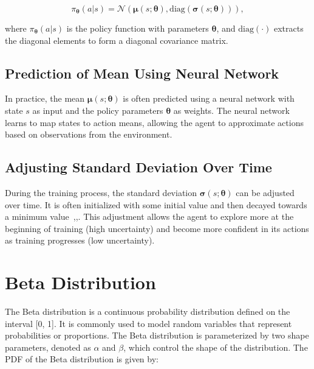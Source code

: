 \begin{equation}
    \pi_{\boldsymbol{\theta}}(a | s) = \mathcal{N}(\boldsymbol{\mu}(s; \boldsymbol{\theta}), \text{diag}(\boldsymbol{\sigma}(s; \boldsymbol{\theta}))),\label{eq:equation2}
\end{equation}

where $\pi_{\boldsymbol{\theta}}(a | s)$ is the policy function with parameters $\boldsymbol{\theta}$, and $\text{diag}(\cdot)$ extracts the diagonal elements to form a diagonal covariance matrix.

\subsection{Prediction of Mean Using Neural Network}\label{subsec:prediction-of-mean-using-neural-network}
In practice, the mean $\boldsymbol{\mu}(s; \boldsymbol{\theta})$ is often predicted using a neural network with state $s$ as input and the policy parameters $\boldsymbol{\theta}$ as weights.
The neural network learns to map states to action means, allowing the agent to approximate actions based on observations from the environment.

\subsection{Adjusting Standard Deviation Over Time}\label{subsec:adjusting-standard-deviation-over-time}
During the training process, the standard deviation $\boldsymbol{\sigma}(s; \boldsymbol{\theta})$ can be adjusted over time.
It is often initialized with some initial value and then decayed towards a minimum value~\cite{capasso2021endtoend},\cite{sutton2018reinforcement},\cite{mnih2015humanlevel}.
This adjustment allows the agent to explore more at the beginning of training (high uncertainty) and become more confident in its actions as training progresses (low uncertainty).

\section{Beta Distribution}\label{sec:beta-distribution}
The Beta distribution is a continuous probability distribution defined on the interval [0, 1].
It is commonly used to model random variables that represent probabilities or proportions.
The Beta distribution is parameterized by two shape parameters, denoted as $\alpha$ and $\beta$, which control the shape of the distribution. The PDF of the Beta distribution is given by:

